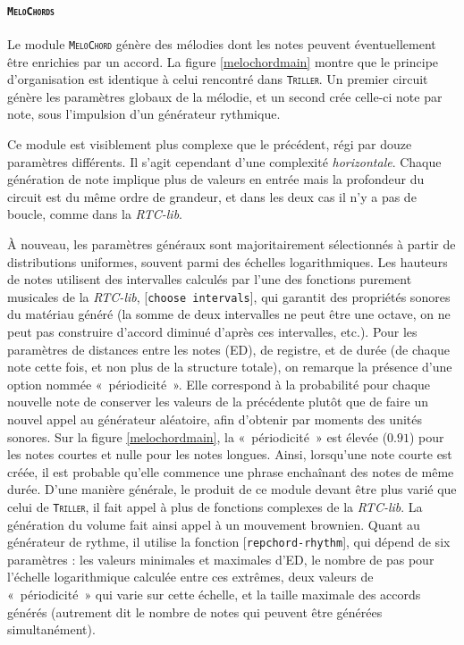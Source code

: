 \documentclass[a4paper,12pt]{article}
\newcommand{\guill}[1]{«~#1~»}
\newcommand{\module}[1]{\texttt{\textsc{#1}}}
\newcommand{\patch}[1]{[\texttt{#1}]}
\begin{document}
\paragraph{\module{MeloChords} \\}

Le module \module{MeloChord} génère des mélodies dont les notes peuvent éventuellement être enrichies par un accord. La figure \ref{melochordmain} montre que le principe d'organisation est identique à celui rencontré dans \module{Triller}. Un premier circuit génère les paramètres globaux de la mélodie, et un second crée celle-ci note par note, sous l'impulsion d'un générateur rythmique.

Ce module est visiblement plus complexe que le précédent, régi par douze paramètres différents. Il s'agit cependant d'une complexité \emph{horizontale}. Chaque génération de note implique plus de valeurs en entrée mais la profondeur du circuit est du même ordre de grandeur, et dans les deux cas il n'y a pas de boucle, comme dans la \emph{RTC-lib}.

À nouveau, les paramètres généraux sont majoritairement sélectionnés à partir de distributions uniformes, souvent parmi des échelles logarithmiques. Les hauteurs de notes utilisent des intervalles calculés par l'une des fonctions purement musicales de la \emph{RTC-lib}, \patch{choose intervals}, qui garantit des propriétés sonores du matériau généré (la somme de deux intervalles ne peut être une octave, on ne peut pas construire d'accord diminué d'après ces intervalles, etc.). Pour les paramètres de distances entre les notes (ED), de registre, et de durée (de chaque note cette fois, et non plus de la structure totale), on remarque la présence d'une option nommée \guill{périodicité}. Elle correspond à la probabilité pour chaque nouvelle note de conserver les valeurs de la précédente plutôt que de faire un nouvel appel au générateur aléatoire, afin d'obtenir par moments des unités sonores. Sur la figure \ref{melochordmain}, la \guill{périodicité} est élevée ($0.91$) pour les notes courtes et nulle pour les notes longues. Ainsi, lorsqu'une note courte est créée, il est probable qu'elle commence une phrase enchaînant des notes de même durée. D'une manière générale, le produit de ce module devant être plus varié que celui de \module{Triller}, il fait appel à plus de fonctions complexes de la \emph{RTC-lib}. La génération du volume fait ainsi appel à un mouvement brownien. Quant au générateur de rythme, il utilise la fonction \patch{repchord-rhythm}, qui dépend de six paramètres : les valeurs minimales et maximales d'ED, le nombre de pas pour l'échelle logarithmique calculée entre ces extrêmes, deux valeurs de \guill{périodicité} qui varie sur cette échelle, et la taille maximale des accords générés (autrement dit le nombre de notes qui peuvent être générées simultanément).
\end{document}
